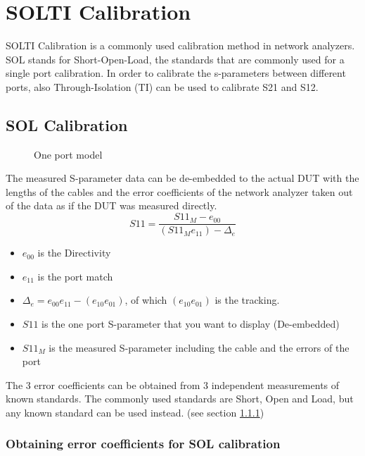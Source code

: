 \section{SOLTI Calibration}
SOLTI Calibration is a commonly used calibration method in network analyzers. SOL stands for Short-Open-Load, the standards that are commonly used for a single port calibration. In order to calibrate the s-parameters between different ports, also Through-Isolation (TI) can be used to calibrate S21 and S12.




\subsection{SOL Calibration}

\begin{figure}[H]
	\centering
	
	\caption{One port model}
	\label{fig:oneportmodel}
\end{figure}


The measured S-parameter data can be de-embedded to the actual DUT with the lengths of the cables and the error coefficients of the network analyzer taken out of the data as if the DUT was measured directly.
	\begin{equation}
	\label{eqn:solcal}
	S11=\frac{S11_{M}-e_{00}}{(S11_{M}e_{11})-\Delta_{e}}
	\end{equation}
	\begin{itemize}
		\item $e_{00}$ is the Directivity
		\item $e_{11}$ is the port match
		\item $\Delta_{e} = e_{00}e_{11}-(e_{10}e_{01})$, of which $(e_{10}e_{01})$ is the tracking.
		\item $S11$ is the one port S-parameter that you want to display (De-embedded)
		\item 	$S11_M$ is the measured S-parameter including the cable and the errors of the port
	\end{itemize}

	The 3 error coefficients can be obtained from 3 independent measurements of known standards. The commonly used standards are Short, Open and Load, but any known standard can be used instead. (see section \ref{sec:obtainingerrorcoefsSOL})
\subsubsection{Obtaining error coefficients for SOL calibration}
\label{sec:obtainingerrorcoefsSOL}

